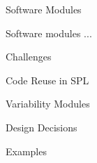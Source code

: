 \begin{frame}{Software Modules}
	\begin{fancycolumns}

	\begin{definition}{Software modules ...}
	\end{definition}
	\nextcolumn
	\pause
			\begin{note}{Challenges}
		\begin{itemize}
			\MajorChallengesOfComponents
		\end{itemize}
	\end{note}
	\end{fancycolumns}
\end{frame}



\begin{frame}{Code Reuse in SPL}
	\begin{fancycolumns}
		
	\end{fancycolumns}
\end{frame}



\begin{frame}{Variability Modules}
	\begin{fancycolumns}
		
	\end{fancycolumns}
\end{frame}


\begin{frame}{Design Decisions}
	\begin{fancycolumns}
		
	\end{fancycolumns}
\end{frame}


\begin{frame}{Examples}
	\begin{fancycolumns}
		
	\end{fancycolumns}
\end{frame}


